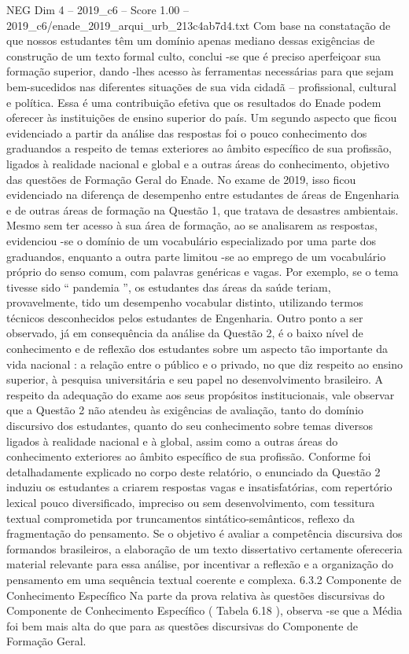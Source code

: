 \begin{textsample}{NEG Dim 4 – 2019\_c6 – Score 1.00 – 2019\_c6/enade\_2019\_arqui\_urb\_213c4ab7d4.txt}
Com base na constatação de que nossos estudantes têm um domínio apenas mediano dessas exigências de construção de um texto formal culto, conclui -se que é preciso aperfeiçoar sua formação superior, dando -lhes acesso às ferramentas necessárias para que sejam bem-sucedidos nas diferentes situações de sua vida cidadã – profissional, cultural e política.
Essa é uma contribuição efetiva que os resultados do Enade podem oferecer às instituições de ensino superior do país.
Um segundo aspecto que ficou evidenciado a partir da análise das respostas foi o pouco conhecimento dos graduandos a respeito de temas exteriores ao âmbito específico de sua profissão, ligados à realidade nacional e global e a outras áreas do conhecimento, objetivo das questões de Formação Geral do Enade.
No exame de 2019, isso ficou evidenciado na diferença de desempenho entre estudantes de áreas de Engenharia e de outras áreas de formação na Questão 1, que tratava de desastres ambientais.
Mesmo sem ter acesso à sua área de formação, ao se analisarem as respostas, evidenciou -se o domínio de um vocabulário especializado por uma parte dos graduandos, enquanto a outra parte limitou -se ao emprego de um vocabulário próprio do senso comum, com palavras genéricas e vagas.
Por exemplo, se o tema tivesse sido “ pandemia ”, os estudantes das áreas da saúde teriam, provavelmente, tido um desempenho vocabular distinto, utilizando termos técnicos desconhecidos pelos estudantes de Engenharia.
Outro ponto a ser observado, já em consequência da análise da Questão 2, é o baixo nível de conhecimento e de reflexão dos estudantes sobre um aspecto tão importante da vida nacional : a relação entre o público e o privado, no que diz respeito ao ensino superior, à pesquisa universitária e seu papel no desenvolvimento brasileiro.
A respeito da adequação do exame aos seus propósitos institucionais, vale observar que a Questão 2 não atendeu às exigências de avaliação, tanto do domínio discursivo dos estudantes, quanto do seu conhecimento sobre temas diversos ligados à realidade nacional e à global, assim como a outras áreas do conhecimento exteriores ao âmbito específico de sua profissão.
Conforme foi detalhadamente explicado no corpo deste relatório, o enunciado da Questão 2 induziu os estudantes a criarem respostas vagas e insatisfatórias, com repertório lexical pouco diversificado, impreciso ou sem desenvolvimento, com tessitura textual comprometida por truncamentos sintático-semânticos, reflexo da fragmentação do pensamento.
Se o objetivo é avaliar a competência discursiva dos formandos brasileiros, a elaboração de um texto dissertativo certamente ofereceria material relevante para essa análise, por incentivar a reflexão e a organização do pensamento em uma sequência textual coerente e complexa. 6.3.2 Componente de Conhecimento Específico Na parte da prova relativa às questões discursivas do Componente de Conhecimento Específico ( Tabela 6.18 ), observa -se que a Média foi bem mais alta do que para as questões discursivas do Componente de Formação Geral.

\end{textsample}
